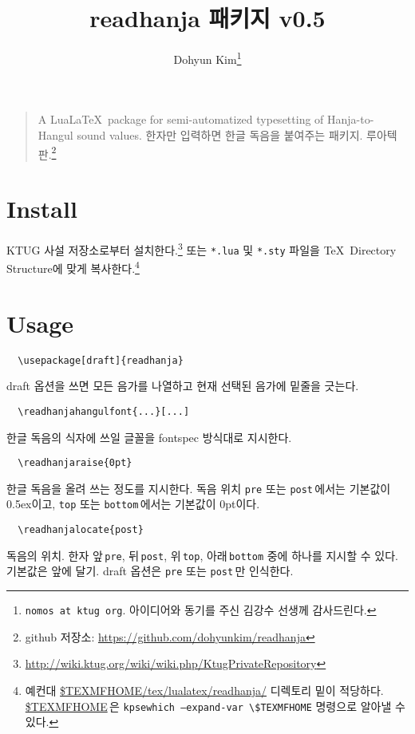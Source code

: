 \documentclass[b5paper]{article}
\begin{document}
\title{\ttfamily readhanja 패키지 v0.5}
\author{Dohyun Kim\thanks{\texttt{nomos at ktug org}.
  아이디어와 동기를 주신 김강수 선생께 감사드린다.}}
\maketitle

\begin{quote}
A Lua\LaTeX\ package for semi-automatized typesetting of
Hanja-to-Hangul sound values.
한자만 입력하면 한글 독음을 붙여주는 패키지. 루아텍 판.\footnote{
  github 저장소: \url{https://github.com/dohyunkim/readhanja}}
\end{quote}

\section*{Install}

KTUG 사설 저장소로부터 설치한다.\footnote{
  \url{http://wiki.ktug.org/wiki/wiki.php/KtugPrivateRepository}}
또는
\verb|*.lua| 및 \verb|*.sty| 파일을 \TeX\ Directory Structure에 맞게 복사한다.\footnote{
  예컨대 \url{$TEXMFHOME/tex/lualatex/readhanja/} 디렉토리 밑이 적당하다.
  \url{$TEXMFHOME}\,은 \texttt{kpsewhich --expand-var \textbackslash\$TEXMFHOME}
  명령으로 알아낼 수 있다.}

\section*{Usage}

\begin{verbatim}
  \usepackage[draft]{readhanja}
\end{verbatim}
draft 옵션을 쓰면 모든 음가를 나열하고 현재 선택된 음가에
밑줄을 긋는다.

\begin{verbatim}
  \readhanjahangulfont{...}[...]
\end{verbatim}
한글 독음의 식자에 쓰일 글꼴을 fontspec 방식대로 지시한다.

\begin{verbatim}
  \readhanjaraise{0pt}
\end{verbatim}
한글 독음을 올려 쓰는 정도를 지시한다.
독음 위치 \verb|pre| 또는 \verb|post|\,에서는 기본값이 0.5ex이고,
\verb|top| 또는 \verb|bottom|\,에서는 기본값이 0pt이다.

\begin{verbatim}
  \readhanjalocate{post}
\end{verbatim}
독음의 위치. 한자 앞\,\verb|pre|, 뒤\,\verb|post|,
위\,\verb|top|, 아래\,\verb|bottom| 중에 하나를 지시할 수 있다.
기본값은 앞에 달기.
draft 옵션은 \verb|pre| 또는 \verb|post|\,만 인식한다.
\end{document}
